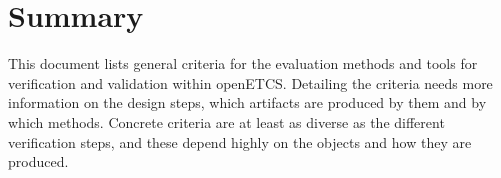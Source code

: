 \documentclass{template/openetcs_article}
\begin{document}
\section{Summary}
\label{sec:summary}

This document lists general criteria for the evaluation methods and
tools for verification and validation within openETCS. Detailing the
criteria needs more information on the design steps, which artifacts
are produced by them and by which methods. Concrete criteria are at
least as diverse as the different verification steps, and these depend
highly on the objects and how they are produced.


%





\end{document}

